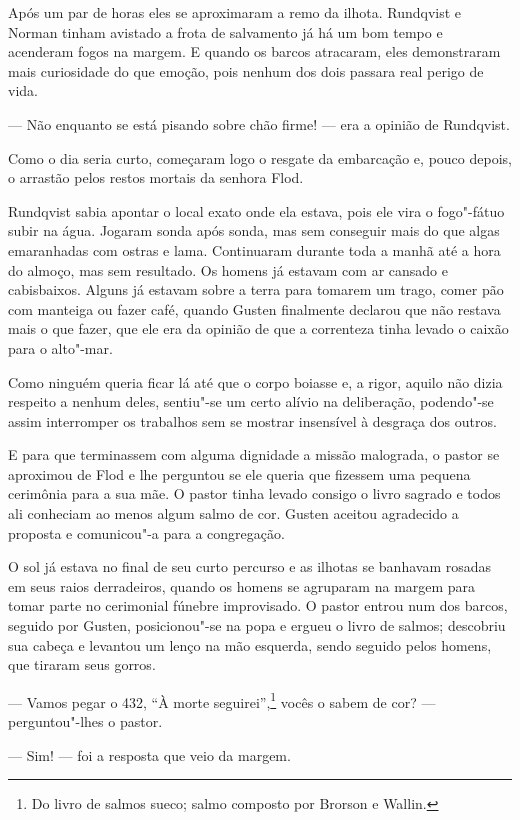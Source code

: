 Após um par de horas eles se aproximaram a remo da ilhota. Rundqvist e Norman
tinham avistado a frota de salvamento já há um bom tempo e acenderam fogos na margem. 
E quando os barcos atracaram, eles demonstraram mais
curiosidade do que emoção, pois nenhum dos dois passara real perigo de vida.

--- Não enquanto se está pisando sobre chão firme! --- era a opinião de Rundqvist.

Como o dia seria curto, começaram logo o resgate da embarcação e, pouco depois,
o arrastão pelos restos mortais da senhora Flod.

Rundqvist sabia apontar o local exato onde ela estava, pois ele vira o
fogo"-fátuo subir na água. Jogaram sonda após sonda, mas sem conseguir mais do
que algas emaranhadas com ostras e lama. Continuaram durante toda a manhã até a
hora do almoço, mas sem resultado. Os homens já estavam com ar cansado e
cabisbaixos. Alguns já estavam sobre a terra para tomarem um trago, comer pão com
manteiga ou fazer café, quando Gusten finalmente declarou que não restava mais o
que fazer, que ele era da opinião de que a correnteza tinha levado o caixão para o alto"-mar.

Como ninguém queria ficar lá até que o corpo boiasse e, a rigor, aquilo não
dizia respeito a nenhum deles, sentiu"-se um certo alívio na deliberação,
podendo"-se assim interromper os trabalhos sem se mostrar insensível à desgraça dos outros.

E para que terminassem com alguma dignidade a missão malograda, o pastor se
aproximou de Flod e lhe perguntou se ele queria que fizessem uma pequena
cerimônia para a sua mãe. O pastor tinha levado consigo o livro sagrado e todos
ali conheciam ao menos algum salmo de cor. Gusten aceitou agradecido a proposta
e comunicou"-a para a congregação.

O sol já estava no final de seu curto percurso e as ilhotas se banhavam rosadas
em seus raios derradeiros, quando os homens se agruparam na margem para tomar
parte no cerimonial fúnebre improvisado. O pastor entrou num dos barcos, seguido
por Gusten, posicionou"-se na popa e ergueu o livro de salmos; descobriu sua cabeça
e levantou um lenço na mão esquerda, sendo seguido pelos homens, que 
tiraram seus gorros.

--- Vamos pegar o 432, ``À morte seguirei'',\footnote{ Do livro 
de salmos sueco; salmo composto por Brorson e Wallin.} vocês o sabem 
de cor? --- perguntou"-lhes o pastor.

--- Sim! --- foi a resposta que veio da margem.

